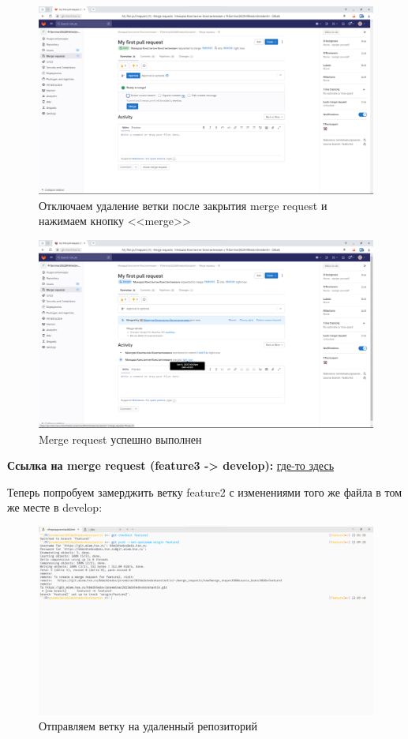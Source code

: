 \documentclass[a4paper]{article}
\begin{document}
  \begin{figure}[H]
    \centering
    \includegraphics[width=\textwidth]{1_ (20)}
    \caption{Отключаем удаление ветки после закрытия merge request и нажимаем кнопку <<merge>>}
  \end{figure}

  \begin{figure}[H]
    \centering
    \includegraphics[width=\textwidth]{1_ (19)}
    \caption{Merge request успешно выполнен}
  \end{figure}

  \textbf{Ссылка на merge request (feature3 -> develop):} \href{https://git.miem.hse.ru/kkmikhedov/prseminar2023mikhedovkonstantin/-/merge_requests/1}{где-то здесь}

  Теперь попробуем замерджить ветку feature2 с изменениями того же файла в том же месте в develop:

  \begin{figure}[H]
    \centering
    \includegraphics[width=\textwidth]{1_ (17)}
    \caption{Отправляем ветку на удаленный репозиторий}
  \end{figure}
\end{document}
